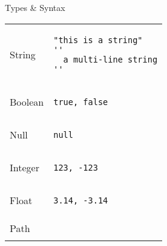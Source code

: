 \documentclass[landscape, 10pt]{article}
\begin{document}
\renewcommand{\arraystretch}{1.5}


\begin{multicols*}{3}

\begin{ctexpression}{Types \& Syntax}
    \begin{tabular}{l p{}}
    String &
        \begin{minipage}{0.5\textwidth}
            \begin{verbatim}
"this is a string"
''
  a multi-line string
''
            \end{verbatim}
        \end{minipage}
        \\
        Boolean &
        \begin{minipage}{0.5\textwidth}
            \begin{verbatim}
true, false
            \end{verbatim}
        \end{minipage}
        \\
        Null &
        \begin{minipage}{0.5\textwidth}
            \begin{verbatim}
null
            \end{verbatim}
        \end{minipage}
        \\
        Integer &
        \begin{minipage}{0.5\textwidth}
            \begin{verbatim}
123, -123
            \end{verbatim}
        \end{minipage}
        \\
        Float &
        \begin{minipage}{0.5\textwidth}
            \begin{verbatim}
3.14, -3.14
            \end{verbatim}
        \end{minipage}
        \\
        Path &
        \begin{minipage}{0.5\textwidth}
            \begin{verbatim}

\end{verbatim}
\end{minipage}
\end{tabular}
\end{ctexpression}
\end{multicols*}
\end{document}
